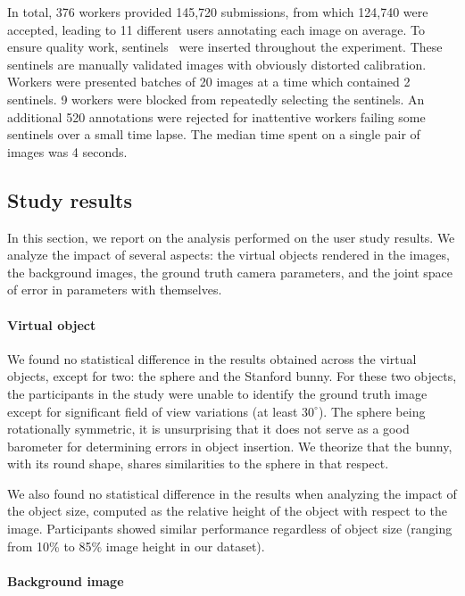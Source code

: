 In total, 376 workers provided 145,720 submissions, from which 124,740 were accepted, leading to 11 different users annotating each image on average. To ensure quality work, sentinels~\cite{Gingold2012} were inserted throughout the experiment. These sentinels are manually validated images with obviously distorted calibration. Workers were presented batches of 20 images at a time which contained 2 sentinels. 9 workers were blocked from repeatedly selecting the sentinels. An additional 520 annotations were rejected for inattentive workers failing some sentinels over a small time lapse. The median time spent on a single pair of images was 4 seconds.


\subsection{Study results}

In this section, we report on the analysis performed on the user study results. We analyze the impact of several aspects: the virtual objects rendered in the images, the background images, the ground truth camera parameters, and the joint space of error in parameters with themselves.


\paragraph{Virtual object}

We found no statistical difference in the results obtained across the virtual objects, except for two: the sphere and the Stanford bunny. For these two objects, the participants in the study were unable to identify the ground truth image except for significant field of view variations (at least $30^\circ$). The sphere being rotationally symmetric, it is unsurprising that it does not serve as a good barometer for determining errors in object insertion. We theorize that the bunny, with its round shape, shares similarities to the sphere in that respect. 

We also found no statistical difference in the results when analyzing the impact of the object size, computed as the relative height of the object with respect to the image. Participants showed similar performance regardless of object size (ranging from 10\% to 85\% image height in our dataset).

\paragraph{Background image}

